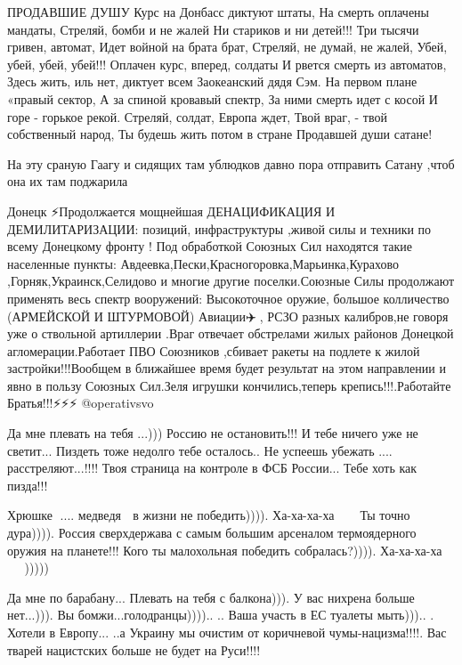 ПРОДАВШИЕ ДУШУ
Курс на Донбасс диктуют штаты,
На смерть оплачены мандаты,
Стреляй, бомби и не жалей
Ни стариков и ни детей!!!
Три тысячи гривен, автомат,
Идет войной на брата брат,
Стреляй, не думай, не жалей,
Убей, убей, убей, убей!!!
Оплачен курс, вперед, солдаты
И рвется смерть из автоматов,
Здесь жить, иль нет, диктует всем
Заокеанский дядя Сэм.
На первом плане «правый сектор,
А за спиной кровавый спектр,
За ними смерть идет с косой
И горе - горькое рекой.
Стреляй, солдат, Европа ждет,
Твой враг, - твой собственный народ,
Ты будешь жить потом в стране
Продавшей души сатане!

На эту сраную Гаагу и сидящих там ублюдков давно пора отправить Сатану ,чтоб
она их там поджарила

Донецк ⚡️Продолжается мощнейшая ДЕНАЦИФИКАЦИЯ И ДЕМИЛИТАРИЗАЦИИ: позиций,
инфраструктуры ,живой силы и техники по всему Донецкому фронту ! Под обработкой
Союзных Сил находятся такие населенные пункты:
Авдеевка,Пески,Красногоровка,Марьинка,Курахово ,Горняк,Украинск,Селидово и
многие другие поселки.Союзные Силы продолжают применять весь спектр вооружений:
Высокоточное оружие, большое колличество (АРМЕЙСКОЙ И ШТУРМОВОЙ) Авиации✈️🚁,
РСЗО разных калибров,не говоря уже о ствольной артиллерии .Враг отвечает
обстрелами жилых районов Донецкой агломерации.Работает ПВО Союзников ,сбивает
ракеты на подлете к жилой застройки!!!Вообщем в ближайшее время будет результат
на этом направлении и явно в пользу Союзных Сил.Зеля игрушки кончились,теперь
крепись!!!.Работайте Братья!!!⚡️⚡️⚡️ @operativsvo

Да мне плевать на тебя ...)))
Россию не остановить!!!
И тебе ничего уже не светит...
Пиздеть тоже недолго тебе осталось..
Не успеешь убежать .... расстреляют...!!!!
Твоя страница на контроле в ФСБ России...
Тебе хоть как пизда!!!

Хрюшке 🐷.... медведя 🐻 в жизни не победить)))).
Ха-ха-ха-ха 🤣🤣🤣🤣🤣
Ты точно дура)))).
Россия сверхдержава с самым большим арсеналом термоядерного оружия на планете!!!
Кого ты малохольная победить собралась?)))).
Ха-ха-ха-ха 🤣🤣🤣🤪🤪🤣🤣)))))

Да мне по барабану...
Плевать на тебя с балкона))).
У вас нихрена больше нет...))).
Вы бомжи...голодранцы)))).. ..
Ваша участь в ЕС туалеты мыть))).. .
Хотели в Европу...
..а Украину мы очистим от коричневой чумы-нацизма!!!!.
Вас тварей нацистских больше не будет на Руси!!!!

